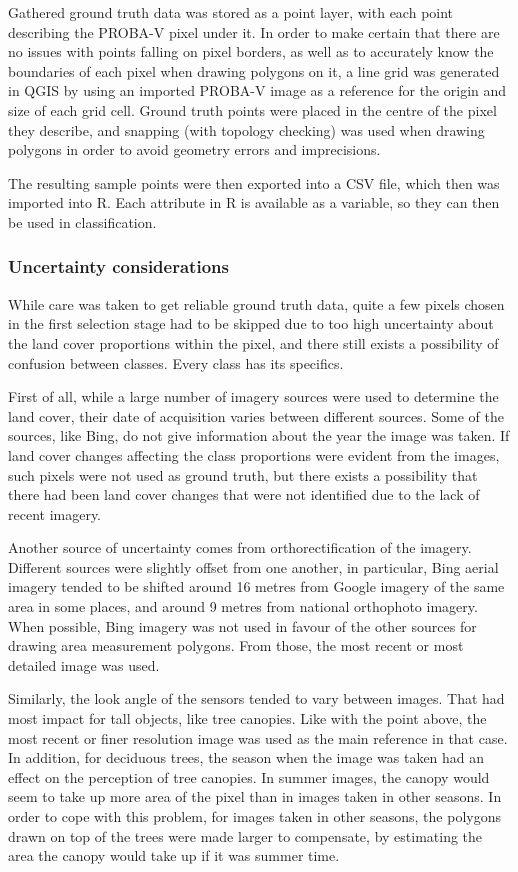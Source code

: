 \documentclass[a4paper,10pt]{book}
\begin{document}
Gathered ground truth data was stored as a point layer, with each point describing the PROBA-V pixel under it. In order to make certain that there are no issues with points falling on pixel borders, as well as to accurately know the boundaries of each pixel when drawing polygons on it, a line grid was generated in QGIS by using an imported PROBA-V image as a reference for the origin and size of each grid cell. Ground truth points were placed in the centre of the pixel they describe, and snapping (with topology checking) was used when drawing polygons in order to avoid geometry errors and imprecisions.

The resulting sample points were then exported into a CSV file, which then was imported into R. Each attribute in R is available as a variable, so they can then be used in classification.

\subsubsection{Uncertainty considerations}

While care was taken to get reliable ground truth data, quite a few pixels chosen in the first selection stage had to be skipped due to too high uncertainty about the land cover proportions within the pixel, and there still exists a possibility of confusion between classes. Every class has its specifics.

First of all, while a large number of imagery sources were used to determine the land cover, their date of acquisition varies between different sources. Some of the sources, like Bing, do not give information about the year the image was taken. If land cover changes affecting the class proportions were evident from the images, such pixels were not used as ground truth, but there exists a possibility that there had been land cover changes that were not identified due to the lack of recent imagery.

Another source of uncertainty comes from orthorectification of the imagery. Different sources were slightly offset from one another, in particular, Bing aerial imagery tended to be shifted around 16 metres from Google imagery of the same area in some places, and around 9 metres from national orthophoto imagery. When possible, Bing imagery was not used in favour of the other sources for drawing area measurement polygons. From those, the most recent or most detailed image was used.

Similarly, the look angle of the sensors tended to vary between images. That had most impact for tall objects, like tree canopies. Like with the point above, the most recent or finer resolution image was used as the main reference in that case. In addition, for deciduous trees, the season when the image was taken had an effect on the perception of tree canopies. In summer images, the canopy would seem to take up more area of the pixel than in images taken in other seasons. In order to cope with this problem, for images taken in other seasons, the polygons drawn on top of the trees were made larger to compensate, by estimating the area the canopy would take up if it was summer time.
\end{document}
